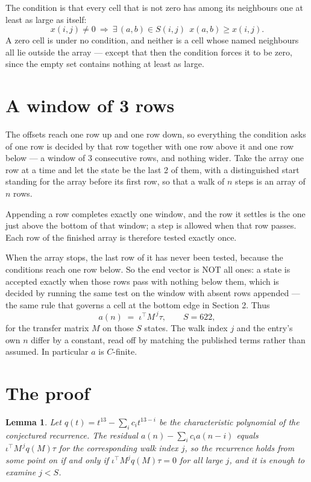 \documentclass[11pt,a4paper]{article}
\theoremstyle{plain}
\newtheorem{lemma}[theorem]{Lemma}
\theoremstyle{definition}
\begin{document}
The condition is that every cell that is not zero has among its neighbours one at least as large as itself:
\[
x(i,j)\neq0\ \Longrightarrow\ \exists\,(a,b)\in S(i,j)\ \ x(a,b)\ge x(i,j).
\]
A zero cell is under no condition, and neither is a cell whose named neighbours all lie outside the array --- except that then the condition forces it to be zero, since the empty set contains nothing at least as large.

\section{A window of 3 rows}

The offsets reach one row up and one row down, so everything the condition asks of one row is
decided by that row together with one row above it and one row below --- a window of
$3$ consecutive rows, and nothing wider. Take the array one row at a time and
let the state be the last 2 of them, with a distinguished start standing for the array before its
first row, so that a walk of $n$ steps is an array of $n$ rows.

Appending a row completes exactly one window, and the row it settles is the one just above the bottom of that window; a step is
allowed when that row passes. Each row of the finished array is therefore tested exactly once.

When the array stops, the last row of it has never been tested, because the
conditions reach one row below. So the end vector is NOT all ones: a state is accepted exactly when
those rows pass with nothing below them, which is decided by running the same test on the window
with absent rows appended --- the same rule that governs a cell at the bottom edge in
Section 2.
Thus
\[
a(n)\;=\;\iota^{\!\top}M^{\,j}\tau ,\qquad S=622,
\]
for the transfer matrix $M$ on those $S$ states. The walk index $j$ and the entry's own $n$
differ by a constant, read off by matching the published terms rather than assumed. In
particular $a$ is $C$-finite.

\section{The proof}

\begin{lemma}\label{lem:crit}
Let $q(t)=t^{13}-\sum_i c_it^{13-i}$ be the characteristic polynomial of the
conjectured recurrence. The residual $a(n)-\sum_ic_ia(n-i)$ equals
$\iota^{\!\top}M^{\,j}q(M)\tau$ for the corresponding walk index $j$, so the recurrence
holds from some point on if and only if $\iota^{\!\top}M^{j}q(M)\tau=0$ for all large $j$,
and it is enough to examine $j<S$.
\end{lemma}
\end{document}

